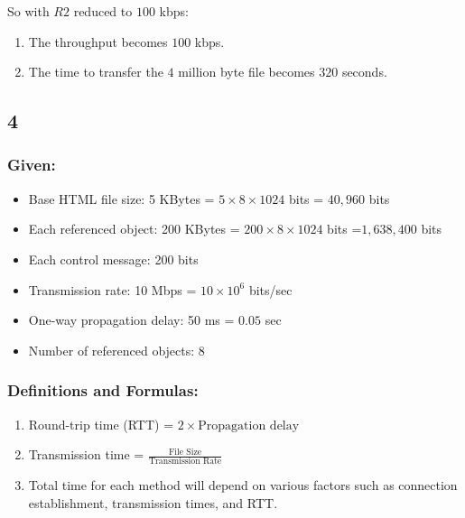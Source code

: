 \documentclass[
]{article}
\providecommand{\tightlist}{%
  \setlength{\itemsep}{0pt}\setlength{\parskip}{0pt}}
\begin{document}
So with \(R2\) reduced to \(100\) kbps:

\begin{enumerate}
\def\labelenumi{\arabic{enumi}.}
\tightlist
\item
  The throughput becomes \(100\) kbps.
\item
  The time to transfer the \(4\) million byte file becomes \(320\)
  seconds.
\end{enumerate}

\hypertarget{section-3}{%
\subsection{4}\label{section-3}}

\hypertarget{given-1}{%
\subsubsection{Given:}\label{given-1}}

\begin{itemize}
\tightlist
\item
  Base HTML file size: 5 KBytes = \(5 \times 8 \times 1024\) bits =
  \(40,960\) bits
\item
  Each referenced object: 200 KBytes = \(200 \times 8 \times 1024\) bits
  =\(1,638,400\) bits
\item
  Each control message: 200 bits
\item
  Transmission rate: 10 Mbps = \(10 \times 10^6\) bits/sec
\item
  One-way propagation delay: 50 ms = \(0.05\) sec
\item
  Number of referenced objects: 8
\end{itemize}

\hypertarget{definitions-and-formulas}{%
\subsubsection{Definitions and
Formulas:}\label{definitions-and-formulas}}

\begin{enumerate}
\def\labelenumi{\arabic{enumi}.}
\tightlist
\item
  Round-trip time (RTT) = \(2 \times \text{Propagation delay}\)
\item
  Transmission time =
  \(\frac{\text{File Size}}{\text{Transmission Rate}}\)
\item
  Total time for each method will depend on various factors such as
  connection establishment, transmission times, and RTT.
\end{enumerate}
\end{document}
